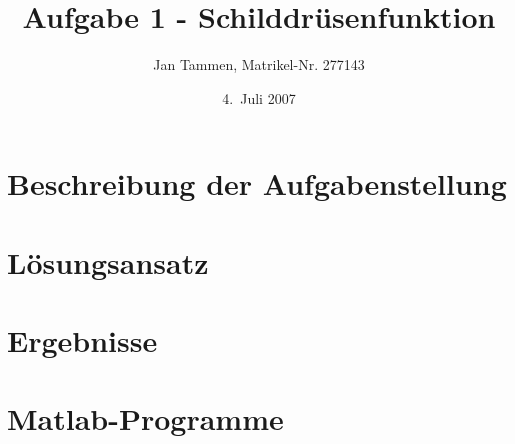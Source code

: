 \documentclass[
	a4paper,     		%
	headsepline, 		%
	footsepline, 		%
	titlepage,   		%
]{scrreprt}
\title{Aufgabe 1 - Schilddrüsenfunktion}
\author{%
	Jan Tammen, Matrikel-Nr. 277143
}%
\date{4.\ Juli 2007}
\begin{document}
\maketitle

\tableofcontents



\chapter{Beschreibung der Aufgabenstellung}


\chapter{Lösungsansatz}


\chapter{Ergebnisse}



\cleardoublepage %
{}

\appendix
\pdfbookmark[-1]{\appendixname}{\appendixname}
\chapter{Matlab-Programme}






\renewcommand{\bibname}{Quellen}



\end{document}
